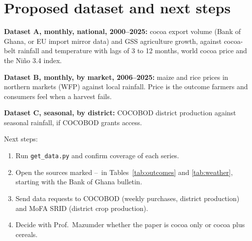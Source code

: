 \documentclass[11pt,letterpaper]{article}
\newcommand{\no}{--}
\begin{document}
\section{Proposed dataset and next steps}

\textbf{Dataset A, monthly, national, 2000--2025:} cocoa export volume (Bank of Ghana, or EU import mirror data) and GSS agriculture growth, against cocoa-belt rainfall and temperature with lags of 3 to 12 months, world cocoa price and the Ni\~no 3.4 index.

\textbf{Dataset B, monthly, by market, 2006--2025:} maize and rice prices in northern markets (WFP) against local rainfall. Price is the outcome farmers and consumers feel when a harvest fails.

\textbf{Dataset C, seasonal, by district:} COCOBOD district production against seasonal rainfall, if COCOBOD grants access.

Next steps:
\begin{enumerate}[itemsep=1pt,topsep=2pt]
\item Run \texttt{get\_data.py} and confirm coverage of each series.
\item Open the sources marked \no\ in Tables~\ref{tab:outcomes} and \ref{tab:weather}, starting with the Bank of Ghana bulletin.
\item Send data requests to COCOBOD (weekly purchases, district production) and MoFA SRID (district crop production).
\item Decide with Prof.\ Mazumder whether the paper is cocoa only or cocoa plus cereals.
\end{enumerate}
\end{document}
